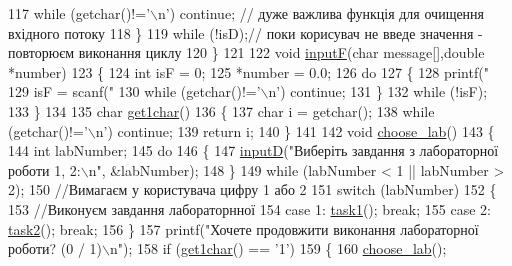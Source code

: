 \begin{DoxyCodeInclude}
{{117         \textcolor{keywordflow}{while} (getchar()!=\textcolor{charliteral}{'\(\backslash\)n'}) \textcolor{keywordflow}{continue}; \textcolor{comment}{// дуже важлива функція для очищення вхідного потоку}
118     \}
119     \textcolor{keywordflow}{while} (!isD);\textcolor{comment}{// поки корисувач не введе значення - повторюєм виконання циклу}
120 \}
121 
122 \textcolor{keywordtype}{void} \hyperlink{main_8c_a67a83febb2bdcd536c9edefe419afb2e}{inputF}(\textcolor{keywordtype}{char} message[],\textcolor{keywordtype}{double} *number)
123 \{
124     \textcolor{keywordtype}{int} isF = 0;
125     *number = 0.0;
126     \textcolor{keywordflow}{do}
127     \{
128         printf(\textcolor{stringliteral}{"%
129         isF = scanf(\textcolor{stringliteral}{"%
130         \textcolor{keywordflow}{while} (getchar()!=\textcolor{charliteral}{'\(\backslash\)n'}) \textcolor{keywordflow}{continue};
131     \}
132     \textcolor{keywordflow}{while} (!isF);
133 \}
134 
135 \textcolor{keywordtype}{char} \hyperlink{main_8c_a20531ce01d5668d3c0eafb037eb3c514}{get1char}()
136 \{
137     \textcolor{keywordtype}{char} i = getchar();
138     \textcolor{keywordflow}{while} (getchar()!=\textcolor{charliteral}{'\(\backslash\)n'}) \textcolor{keywordflow}{continue};
139     \textcolor{keywordflow}{return} i;
140 \}
141 
142 \textcolor{keywordtype}{void} \hyperlink{main_8c_a967daaa1c8b4c7d21c4ccf7a81fbe67d}{choose\_lab}()
143 \{
144     \textcolor{keywordtype}{int} labNumber;
145     \textcolor{keywordflow}{do}
146     \{
147         \hyperlink{main_8c_aa9f623385e5c1c8ac44a985d44cf3c5a}{inputD}(\textcolor{stringliteral}{"Виберіть завдання з лабораторної роботи 1, 2:\(\backslash\)n"}, &labNumber);
148     \}
149     \textcolor{keywordflow}{while} (labNumber < 1 || labNumber > 2);
150     \textcolor{comment}{//Вимагаєм у користувача цифру 1 або 2}
151     \textcolor{keywordflow}{switch} (labNumber)
152     \{
153         \textcolor{comment}{//Виконуєм завдання лабораторнної}
154         \textcolor{keywordflow}{case} 1: \hyperlink{main_8c_afde07648040c326129670547738a0c86}{task1}(); \textcolor{keywordflow}{break};
155         \textcolor{keywordflow}{case} 2: \hyperlink{main_8c_afb35a54f26606b4808ac0a8d9ad55433}{task2}(); \textcolor{keywordflow}{break};
156     \}
157     printf(\textcolor{stringliteral}{"Хочете продовжити виконання лабораторної роботи? (0 / 1)\(\backslash\)n"});
158     \textcolor{keywordflow}{if} (\hyperlink{main_8c_a20531ce01d5668d3c0eafb037eb3c514}{get1char}() == \textcolor{charliteral}{'1'})
159     \{
160         \hyperlink{main_8c_a967daaa1c8b4c7d21c4ccf7a81fbe67d}{choose\_lab}();
}}}}
\end{DoxyCodeInclude}
